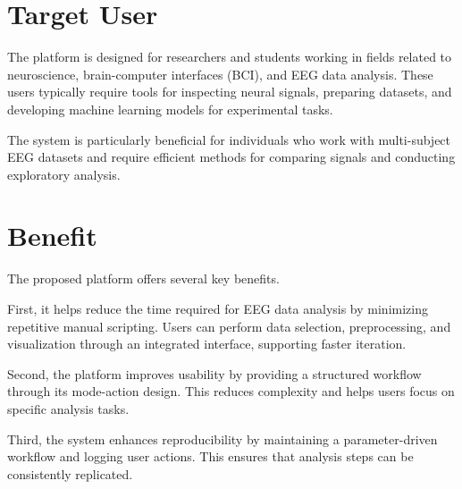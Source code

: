 
\section{Target User}
\label{sec:target-user}

The platform is designed for researchers and students working in fields related to neuroscience, brain-computer interfaces (BCI), and EEG data analysis. These users typically require tools for inspecting neural signals, preparing datasets, and developing machine learning models for experimental tasks.
\vspace{1em}

The system is particularly beneficial for individuals who work with multi-subject EEG datasets and require efficient methods for comparing signals and conducting exploratory analysis.

\section{Benefit}
\label{sec:benefit}

\noindent
The proposed platform offers several key benefits.
\vspace{0.5em}

First, it helps reduce the time required for EEG data analysis by minimizing repetitive manual scripting. Users can perform data selection, preprocessing, and visualization through an integrated interface, supporting faster iteration.
\vspace{0.5em}

Second, the platform improves usability by providing a structured workflow through its mode-action design. This reduces complexity and helps users focus on specific analysis tasks.
\vspace{0.5em}

Third, the system enhances reproducibility by maintaining a parameter-driven workflow and logging user actions. This ensures that analysis steps can be consistently replicated.
\vspace{0.5em}

